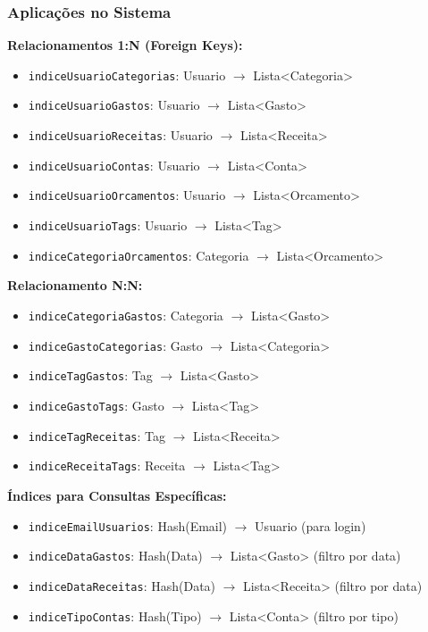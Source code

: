 \documentclass[12pt,a4paper]{article}
\begin{document}
\subsubsection*{Aplicações no Sistema}

\textbf{Relacionamentos 1:N (Foreign Keys):}
\begin{itemize}
  \item \texttt{indiceUsuarioCategorias}: Usuario $\rightarrow$ Lista<Categoria>
  \item \texttt{indiceUsuarioGastos}: Usuario $\rightarrow$ Lista<Gasto>
  \item \texttt{indiceUsuarioReceitas}: Usuario $\rightarrow$ Lista<Receita>
  \item \texttt{indiceUsuarioContas}: Usuario $\rightarrow$ Lista<Conta>
  \item \texttt{indiceUsuarioOrcamentos}: Usuario $\rightarrow$ Lista<Orcamento>
  \item \texttt{indiceUsuarioTags}: Usuario $\rightarrow$ Lista<Tag>
  \item \texttt{indiceCategoriaOrcamentos}: Categoria $\rightarrow$ Lista<Orcamento>
\end{itemize}

\textbf{Relacionamento N:N:}
\begin{itemize}
  \item \texttt{indiceCategoriaGastos}: Categoria $\rightarrow$ Lista<Gasto>
  \item \texttt{indiceGastoCategorias}: Gasto $\rightarrow$ Lista<Categoria>
  \item \texttt{indiceTagGastos}: Tag $\rightarrow$ Lista<Gasto>
  \item \texttt{indiceGastoTags}: Gasto $\rightarrow$ Lista<Tag>
  \item \texttt{indiceTagReceitas}: Tag $\rightarrow$ Lista<Receita>
  \item \texttt{indiceReceitaTags}: Receita $\rightarrow$ Lista<Tag>
\end{itemize}

\textbf{Índices para Consultas Específicas:}
\begin{itemize}
  \item \texttt{indiceEmailUsuarios}: Hash(Email) $\rightarrow$ Usuario (para login)
  \item \texttt{indiceDataGastos}: Hash(Data) $\rightarrow$ Lista<Gasto> (filtro por data)
  \item \texttt{indiceDataReceitas}: Hash(Data) $\rightarrow$ Lista<Receita> (filtro por data)
  \item \texttt{indiceTipoContas}: Hash(Tipo) $\rightarrow$ Lista<Conta> (filtro por tipo)
\end{itemize}
\end{document}

